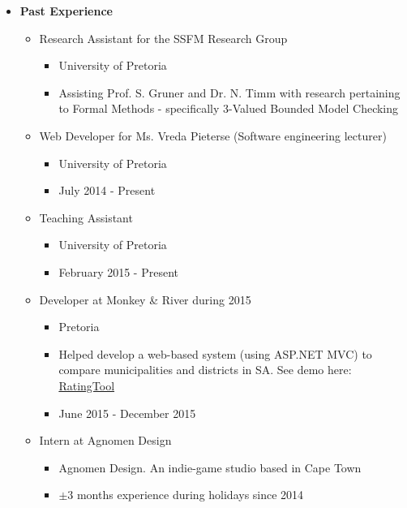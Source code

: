 \documentclass{article}
\begin{document}
	\begin{itemize}
		\item \textbf{Past Experience}
		\begin{itemize}
			\item Research Assistant for the SSFM Research Group
			\begin{itemize}
				\item University of Pretoria
				\item Assisting Prof. S. Gruner and Dr. N. Timm with research pertaining to Formal Methods - specifically 3-Valued Bounded Model Checking
			\end{itemize}
			\item Web Developer for Ms. Vreda Pieterse (Software engineering lecturer)
			\begin{itemize}
				\item University of Pretoria
				\item July 2014 - Present
			\end{itemize}
			\item Teaching Assistant
			\begin{itemize}
				\item University of Pretoria
				\item February 2015 - Present
			\end{itemize}
			
			\item Developer at Monkey \& River during 2015
			\begin{itemize}
				\item Pretoria
				\item Helped develop a web-based system (using ASP.NET MVC) to compare municipalities and districts in SA. See demo here: \href{http://salgabarometerdemo.org.za/RatingTool}{RatingTool}
				\item June 2015 - December 2015
			\end{itemize}
			
			\item Intern at Agnomen Design
			\begin{itemize}
				\item Agnomen Design. An indie-game studio based in Cape Town
				\item $ \pm 3 $ months experience during holidays since 2014
			\end{itemize}
		\end{itemize}
		

\end{itemize}
\end{document}
